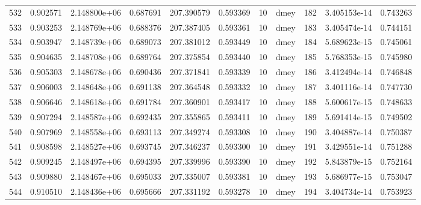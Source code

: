 \begin{tabular}{lrrrrrrlrrr}
532  &    0.902571 &        2.148800e+06 &  0.687691 &              207.390579 &    0.593369 &      10 &         dmey &    182 &   3.405153e-14 &      0.743263 \\
533  &    0.903253 &        2.148769e+06 &  0.688376 &              207.387405 &    0.593361 &      10 &         dmey &    183 &   3.405474e-14 &      0.744151 \\
534  &    0.903947 &        2.148739e+06 &  0.689073 &              207.381012 &    0.593449 &      10 &         dmey &    184 &   5.689623e-15 &      0.745061 \\
535  &    0.904635 &        2.148708e+06 &  0.689764 &              207.375854 &    0.593440 &      10 &         dmey &    185 &   5.768353e-15 &      0.745980 \\
536  &    0.905303 &        2.148678e+06 &  0.690436 &              207.371841 &    0.593339 &      10 &         dmey &    186 &   3.412494e-14 &      0.746848 \\
537  &    0.906003 &        2.148648e+06 &  0.691138 &              207.364548 &    0.593332 &      10 &         dmey &    187 &   3.401116e-14 &      0.747730 \\
538  &    0.906646 &        2.148618e+06 &  0.691784 &              207.360901 &    0.593417 &      10 &         dmey &    188 &   5.600617e-15 &      0.748633 \\
539  &    0.907294 &        2.148587e+06 &  0.692435 &              207.355865 &    0.593411 &      10 &         dmey &    189 &   5.691414e-15 &      0.749502 \\
540  &    0.907969 &        2.148558e+06 &  0.693113 &              207.349274 &    0.593308 &      10 &         dmey &    190 &   3.404887e-14 &      0.750387 \\
541  &    0.908598 &        2.148527e+06 &  0.693745 &              207.346237 &    0.593300 &      10 &         dmey &    191 &   3.429551e-14 &      0.751288 \\
542  &    0.909245 &        2.148497e+06 &  0.694395 &              207.339996 &    0.593390 &      10 &         dmey &    192 &   5.843879e-15 &      0.752164 \\
543  &    0.909880 &        2.148467e+06 &  0.695033 &              207.335007 &    0.593381 &      10 &         dmey &    193 &   5.686977e-15 &      0.753047 \\
544  &    0.910510 &        2.148436e+06 &  0.695666 &              207.331192 &    0.593278 &      10 &         dmey &    194 &   3.404734e-14 &      0.753923 \\

\end{tabular}
